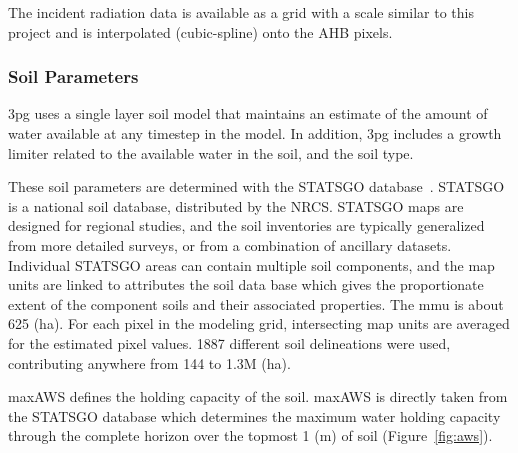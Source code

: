 \documentclass[preprint,12pt]{elsarticle}
\begin{document}
The incident radiation data is available as a grid with a scale
similar to this project and is interpolated (cubic-spline) onto the
\ac{AHB} pixels.

\subsubsection{Soil Parameters}
\label{sec:soil}

\ac{3pg} uses a single layer soil model that maintains an estimate of
the amount of water available at any timestep in the model.  In
addition, \ac{3pg} includes a growth limiter related to the available
water in the soil, and the soil type.

These soil parameters are determined with the \acf{STATSGO}
database~\cite{STATSGO}.  \ac{STATSGO} is a national soil database,
distributed by the \ac{NRCS}.  \ac{STATSGO} maps are designed for
regional studies, and the soil inventories are typically generalized
from more detailed surveys, or from a combination of ancillary
datasets.  Individual \ac{STATSGO} areas can contain multiple soil
components, and the map units are linked to attributes the soil data
base which gives the proportionate extent of the component soils and
their associated properties.  The \ac{mmu} is about 625 (ha).  For
each pixel in the modeling grid, intersecting map units are averaged
for the estimated pixel values.  1887 different soil delineations were
used, contributing anywhere from 144 to 1.3M (ha).

\ac{maxAWS} defines the holding capacity of the soil.
\ac{maxAWS} is directly taken from the \ac{STATSGO} database which
determines the maximum water holding capacity through the complete
horizon over the topmost 1 (m) of soil (Figure~\ref{fig:aws}).
\end{document}
